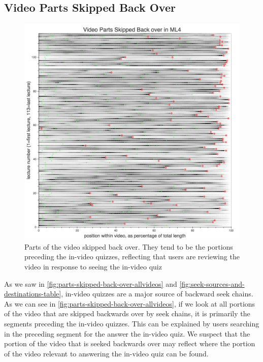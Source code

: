 \documentclass{sigchi}
\begin{document}
\subsection{Video Parts Skipped Back Over}

\begin{figure}
\includegraphics[width=1.0\columnwidth]{parts-skipped-back-over-allvideos}
\caption{Parts of the video skipped back over. They tend to be the portions preceding the in-video quizzes, reflecting that users are reviewing the video in response to seeing the in-video quiz}
\label{fig:parts-skipped-back-over-allvideos}
\end{figure}

As we saw in \autoref{fig:parts-skipped-back-over-allvideos} and \autoref{fig:seek-sources-and-destinations-table}, in-video quizzes are a major source of backward seek chains. As we can see in \autoref{fig:parts-skipped-back-over-allvideos}, if we look at all portions of the video that are skipped backwards over by seek chains, it is primarily the segments preceding the in-video quizzes. This can be explained by users searching in the preceding segment for the answer the in-video quiz. We suspect that the portion of the video that is seeked backwards over may reflect where the portion of the video relevant to answering the in-video quiz can be found.
\end{document}
